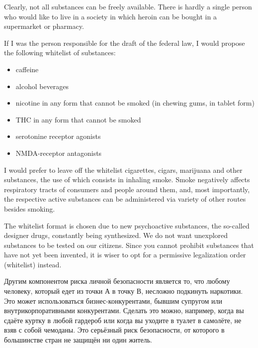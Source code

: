 \documentclass[11pt]{article}
\theoremstyle{remark}
\theoremstyle{definition}
\begin{document}
Clearly, not all substances can be freely available. There is hardly a single person who would like to live in a society in which heroin can be bought in a supermarket or pharmacy.

If I was the person responsible for the draft of the federal law, I would propose the following whitelist of substances:

\begin{itemize}
\item caffeine
\item alcohol beverages
\item nicotine in any form that cannot be smoked (in chewing gums, in tablet form)
\item THC in any form that cannot be smoked
\item serotonine receptor agonists
\item NMDA-receptor antagonists
\end{itemize}

I would prefer to leave off the whitelist cigarettes, cigars, marijuana and other substances, the use of which consists in inhaling smoke. Smoke negatively affects respiratory tracts of consumers and people around them, and, most importantly, the respective active substances can be administered via variety of other routes besides smoking. 

The whitelist format is chosen due to new psychoactive substances, the so-called designer drugs, constantly being synthesized. We do not want unexplored substances to be tested on our citizens. Since you cannot prohibit substances that have not yet been invented, it is wiser to opt for a permissive legalization order (whitelist) instead.














Другим компонентом риска личной безопасности является то, что любому человеку, который едет из точки А в точку В, несложно подкинуть наркотики. Это может использоваться бизнес-конкурентами, бывшим супругом или внутрикорпоративными конкурентами. Сделать это можно, например, когда вы сдаёте куртку в любой гардероб или когда вы уходите в туалет в самолёте, не взяв с собой чемоданы. Это серьёзный риск безопасности, от которого в большинстве стран не защищён ни один житель.
\end{document}
